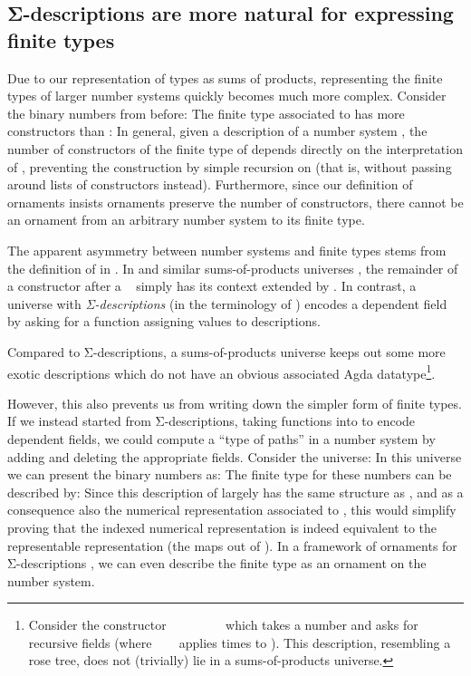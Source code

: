 \subsection{Σ-descriptions are more natural for expressing finite types}\label{sec:closed-universe}
Due to our representation of types as sums of products, representing the finite types of larger number systems quickly becomes much more complex. Consider the binary numbers from before:
The finite type associated to  has more constructors than :
In general, given a description of a number system , the number of constructors of the finite type  of  depends directly on the interpretation of , preventing the construction  by simple recursion on  (that is, without passing around lists of constructors instead). Furthermore, since our definition of ornaments insists ornaments preserve the number of constructors, there cannot be an ornament from an arbitrary number system to its finite type. 

The apparent asymmetry between number systems and finite types stems from the definition of  in . In  and similar sums-of-products universes \cite{practgen,sijsling}, the remainder of a constructor  after a \  simply has its context extended by . In contrast, a universe with \emph{Σ-descriptions} \cite{effectfully,progorn,algorn} (in the terminology of \cite{sijsling}) encodes a dependent field  by asking for a function  assigning values  to descriptions.

Compared to Σ-descriptions, a sums-of-products universe keeps out some more exotic descriptions which do not have an obvious associated Agda datatype\footnote{Consider the constructor \ \bN{}\ \ \ \ \ \ \  which takes a number  and asks for  recursive fields (where \ \ \  applies   times to ). This description, resembling a rose tree, does not (trivially) lie in a sums-of-products universe.}.

However, this also prevents us from writing down the simpler form of finite types. If we instead started from Σ-descriptions, taking functions into  to encode dependent fields, we could compute a ``type of paths'' in a number system by adding and deleting the appropriate fields. Consider the universe:
In this universe we can present the binary numbers as:
The finite type for these numbers can be described by:
Since this description of  largely has the same structure as , and as a consequence also the numerical representation associated to , this would simplify proving that the indexed numerical representation is indeed equivalent to the representable representation (the maps out of ). In a framework of ornaments for Σ-descriptions \cite{progorn,algorn}, we can even describe the finite type as an ornament on the number system.


